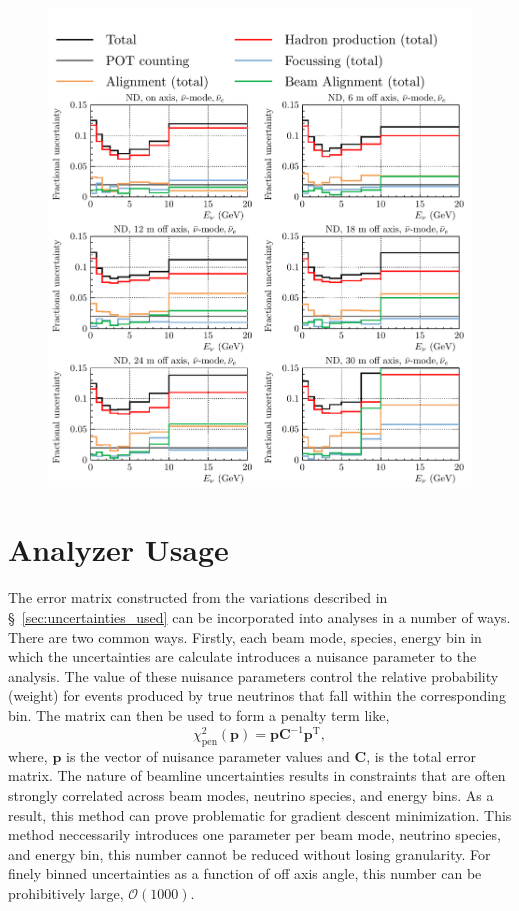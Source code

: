 \documentclass{article}
\begin{document}
\begin{figure}
  \includegraphics[width=\textwidth]{plots/fracerrs/nubarmode_nuebar_ErrType_OffAxis}
  \caption{}
  \label{fig:grp_nubar_nuebar_offaxis}
\end{figure}


\section{Analyzer Usage}
\label{sec:analyzer_usage}

The error matrix constructed from the variations described in \S~\ref{sec:uncertainties_used} can be incorporated into analyses in a number of ways. There are two common ways. Firstly, each beam mode, species, energy bin in which the uncertainties are calculate introduces a nuisance parameter to the analysis. The value of these nuisance parameters control the relative probability (weight) for events produced by true neutrinos that fall within the corresponding bin. The matrix can then be used to form a penalty term like,
\[\chi^{2}_\textrm{pen}\left(\textbf{p}\right)=\textbf{p}\mathbf{C}^{-1}\textbf{p}^\mathrm{T},\]
where, $\textbf{p}$ is the vector of nuisance parameter values and $\mathbf{C}$, is the total error matrix. The nature of beamline uncertainties results in constraints that are often strongly correlated across beam modes, neutrino species, and energy bins. As a result, this method can prove problematic for gradient descent minimization. This method neccessarily introduces one parameter per beam mode, neutrino species, and energy bin, this number cannot be reduced without losing granularity. For finely binned uncertainties as a function of off axis angle, this number can be prohibitively large, $\mathcal{O}\left(1000\right)$.
\end{document}
